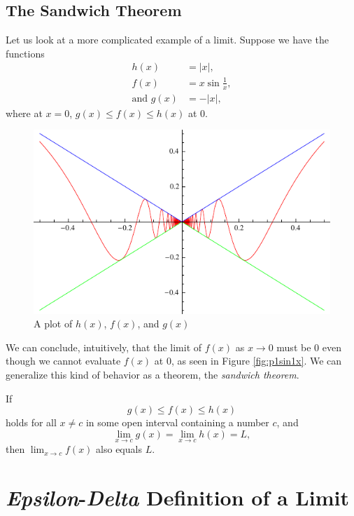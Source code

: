 \subsection{The Sandwich Theorem}
Let us look at a more complicated example of a limit.
Suppose we have the functions
\begin{align*}
  h(x) &= |x|, \\
  f(x) &= x\sin{\frac{1}{x}}, \\
  \text{and }g(x) &= -|x|,
\end{align*}
where at \(x=0\), \(g(x) \leq f(x) \leq h(x)\) at 0.
\begin{figure}[H]
  \begin{center}
    \includegraphics{graphs/sandwichtheorem.pdf}
  \end{center}
  \caption{A plot of \(h(x)\), \(f(x)\), and \(g(x)\)}
\end{figure}
We can conclude, intuitively, that the limit of \(f(x)\) as \(x \to 0\) must be
0 even though we cannot evaluate \(f(x)\) at 0, as seen in Figure
\ref{fig:p1sin1x}. We can generalize this kind of behavior as a theorem, the
\emph{sandwich theorem}.
\begin{theorem}
  If \[g(x) \leq f(x) \leq h(x)\] holds for all \(x \neq c\) in some open interval containing a number \(c\),
  and
  \[ \lim_{x \to c} g(x) = \lim_{x \to c} h(x) = L, \]
  then \(\lim_{x \to c} f(x)\) also equals $L$.
  \label{th:sandwich}
\end{theorem}

\section{\emph{Epsilon}-\emph{Delta} Definition of a Limit}

